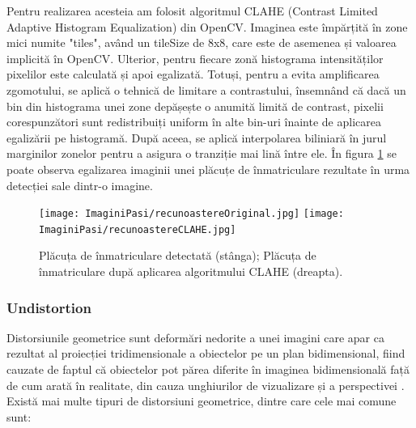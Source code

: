 \documentclass[12pt]{article}
\begin{document}
Pentru realizarea acesteia am folosit algoritmul CLAHE (Contrast Limited Adaptive Histogram Equalization) din OpenCV. Imaginea este \^{i}mp\u{a}rțit\u{a} \^{i}n zone mici numite "tiles", av\^{a}nd un tileSize de 8x8, care este de asemenea și valoarea implicit\u{a} \^{i}n OpenCV. Ulterior, pentru fiecare zon\u{a} histograma intensit\u{a}ților pixelilor este calculat\u{a} și apoi egalizat\u{a}. Totuși, pentru a evita amplificarea zgomotului, se aplic\u{a} o tehnic\u{a} de limitare a contrastului, \^{i}nsemn\^{a}nd c\u{a} dac\u{a} un bin din histograma unei zone dep\u{a}șește o anumit\u{a} limit\u{a} de contrast, pixelii corespunz\u{a}tori sunt redistribuiți uniform \^{i}n alte bin-uri \^{i}nainte de aplicarea egaliz\u{a}rii pe histogram\u{a}. Dup\u{a} aceea, se aplic\u{a} interpolarea biliniar\u{a} \^{i}n jurul marginilor zonelor pentru a asigura o tranziție mai lin\u{a} \^{i}ntre ele. \^{I}n figura \ref{fig:recunoastere_clahe} se poate observa egalizarea imaginii unei pl\u{a}cuțe de \^{i}nmatriculare rezultate \^{i}n urma detecției sale dintr-o imagine.

\begin{figure}[H]
  \centering
  \texttt{[image: ImaginiPasi/recunoastereOriginal.jpg]}\hfill
    \texttt{[image: ImaginiPasi/recunoastereCLAHE.jpg]}
  \caption{Pl\u{a}cuța de \^{i}nmatriculare detectat\u{a} (st\^{a}nga); Pl\u{a}cuța de \^{i}nmatriculare dup\u{a} aplicarea algoritmului CLAHE (dreapta).}
  \label{fig:recunoastere_clahe}
\end{figure}

\subsubsection{Undistortion}


Distorsiunile geometrice sunt deform\u{a}ri nedorite a unei imagini care apar ca rezultat al proiecției tridimensionale a obiectelor pe un plan bidimensional, fiind cauzate de faptul c\u{a} obiectelor pot p\u{a}rea diferite \^{i}n imaginea bidimensional\u{a} faț\u{a} de cum arat\u{a} \^{i}n realitate, din cauza unghiurilor de vizualizare și a perspectivei \cite{geometricdistortion}. Exist\u{a} mai multe tipuri de distorsiuni geometrice, dintre care cele mai comune sunt:
\end{document}
